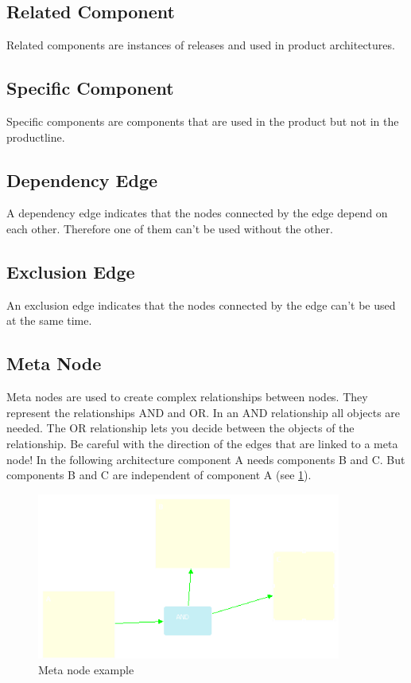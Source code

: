 \subsection{Related Component}
Related components are instances of releases and used in product architectures.

\subsection{Specific Component}

Specific components are components that are used in the product but not in the
productline.

\subsection{Dependency Edge}

A dependency edge indicates that the nodes connected by the edge depend on each other.
Therefore one of them can't be used without the other.

\subsection{Exclusion Edge}

An exclusion edge indicates that the nodes connected by the edge can't be used
at the same time.

\subsection{Meta Node}

Meta nodes are used to create complex relationships between nodes. They represent
the relationships AND and OR. In an AND relationship all objects are needed. The OR
relationship lets you decide between the objects of the relationship.
Be careful with
the direction of the edges that are linked to a meta node! In the following architecture component A
needs components B and C. But components B and C are independent of component A (see \ref{example}).

\begin{figure}[h!]
\begin{center}
\includegraphics[width=10cm]{example.png}
   \caption{Meta node example}
\label{example}
\end{center}
\end{figure}\par


